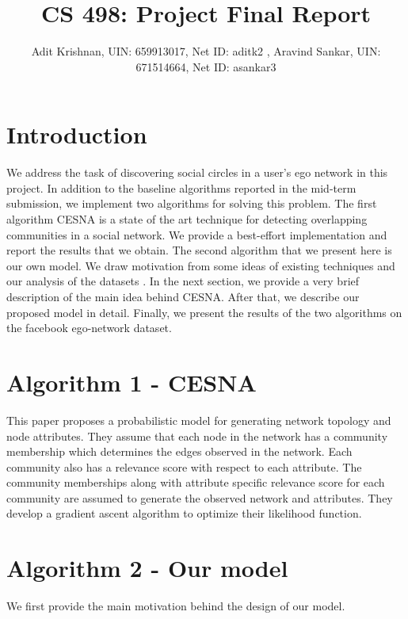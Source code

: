 \documentclass[11pt]{article}
\begin{document}
 
 
 
\title{CS 498: Project Final Report}%
\author{Adit Krishnan, UIN: 659913017, Net ID: aditk2 , Aravind Sankar, UIN: 671514664, Net ID: asankar3 \\} %
\maketitle


\section{Introduction}
We address the task of discovering social circles in a user's ego network in this project. In addition to the baseline algorithms reported in the mid-term submission, we implement two algorithms for solving this problem. The first algorithm CESNA \cite{cesna} is a state of the art technique for detecting overlapping communities in a social network. We provide a best-effort implementation and report the results that we obtain. The second algorithm that we present here is our own model. We draw motivation from some ideas of existing techniques and our analysis of the datasets \cite{SNAP dataset}. 
In the next section, we provide a very brief description of the main idea behind CESNA. 
After that, we describe our proposed model in detail. Finally, we present the results of the two algorithms on the facebook ego-network dataset.

\section{Algorithm 1 - CESNA}
This paper proposes a probabilistic model for generating network topology and node attributes. They assume that each node in the network has a community membership which determines the edges observed in the network. Each community also has a relevance score with respect to each attribute. The community memberships along with attribute specific relevance score for each community are assumed to generate the observed network and attributes. They develop a gradient ascent algorithm to optimize their likelihood function.
\section{Algorithm 2 - Our model}
We first provide the main motivation behind the design of our model.
\end{document}
